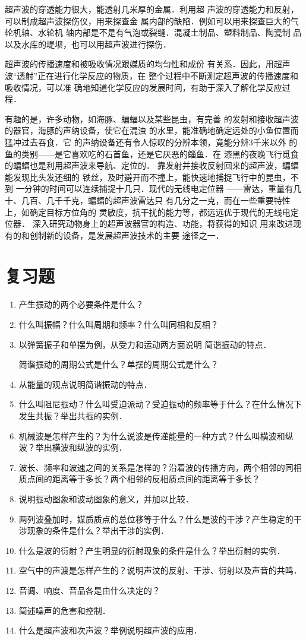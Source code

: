 超声波的穿透能力很大，能透射几米厚的金属．利用超
声波的穿透能力和反射，可以制成超声波探伤仪，用来探查金
属内部的缺陷．例如可以用来探查巨大的气轮机轴、水轮机
轴内部是不是有气泡或裂缝．混凝土制品、塑料制品、陶瓷制
品以及水库的堤坝，也可以用超声波进行探伤．

超声波的传播速度和被吸收情况跟媒质的均匀性和成份
有关系．因此，用超声波“透射”正在进行化学反应的物质，在
整个过程中不断测定超声波的传播速度和吸收情况，可以准
确地知道化学反应的发展时间，有助于深入了解化学反应过
程．

有趣的是，许多动物，如海豚、蝙蝠以及某些昆虫，有完善
的发射和接收超声波的器官，海豚的声纳设备，使它在混浊
的水里，能准确地确定远处的小鱼位置而猛冲过去吞食．它
的声纳设备还有令人惊叹的分辨本领，竟能分辨3千米以外
的鱼的类别——是它喜欢吃的石首鱼，还是它厌恶的鲻鱼．在
漆黑的夜晚飞行觅食的蝙蝠也是利用超声波来导航、定位的．
靠发射并接收反射回来的超声波，蝙蝠能发现比头发还细的
铁丝，及时避开而不撞上，能快速地捕捉飞行中的昆虫，不到
一分钟的时间可以连续捕捉十几只．现代的无线电定位器
——雷达，重量有几十、几百、几千千克，蝙蝠的超声波雷达只
有几分之一克，而在一些重要特性上，如确定目标方位角的
灵敏度，抗干扰的能力等，都远远优于现代的无线电定位器．
深入研究动物身上的超声波器官的构造、功能，将获得的知识
用来改进现有的和创制新的设备，是发展超声波技术的主要
途径之一．

\section*{复习题}
\begin{enumerate}
    \item 产生振动的两个必要条件是什么？
    \item 什么叫振幅？什么叫周期和频率？什么叫同相和反相？
    \item 以弹簧振子和单摆为例，从受力和运动两方面说明
简谐振动的特点．

简谐振动的周期公式是什么？单摆的周期公式是什么？

\item 从能量的观点说明简谐振动的特点．
\item 什么叫阻尼振动？什么叫受迫派动？受迫振动的频率等于什么？在什么情况下发生共振？举出共振的实例．
\item 机械波是怎样产生的？为什么说波是传递能量的一种方式？什么叫横波和纵波？举出横波和纵波的实例．
\item 波长、频率和波速之间的关系是怎样的？沿着波的传播方向，两个相邻的同相质点间的距离等于多长？两个相邻的反相质点间的距离等于多长？
\item 说明振动图象和波动图象的意义，并加以比较．
\item 两列波叠加时，媒质质点的总位移等于什么？什么是波的干涉？产生稳定的干涉现象的条件是什么？举出干涉的实例．
\item 什么是波的衍射？产生明显的衍射现象的条件是什么？举出衍射的实例．
\item 空气中的声渡是怎样产生的？说明声汶的反射、干涉、衍射以及声音的共鸣．
\item 音调、响度、音品各是由什么决定的？
\item 简述噪声的危害和控制．
\item 什么是超声波和次声波？举例说明超声波的应用．
\end{enumerate}



